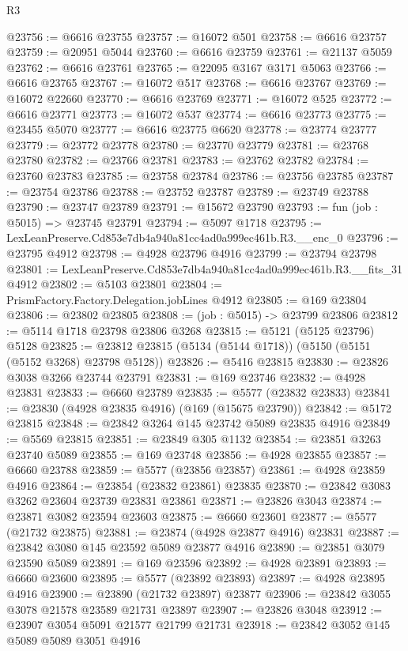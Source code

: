 \begin{lexlean}{R3}
\begin{coremodule}
@23756 := @6616 @23755
@23757 := @16072 @501
@23758 := @6616 @23757
@23759 := @20951 @5044
@23760 := @6616 @23759
@23761 := @21137 @5059
@23762 := @6616 @23761
@23765 := @22095 @3167 @3171 @5063
@23766 := @6616 @23765
@23767 := @16072 @517
@23768 := @6616 @23767
@23769 := @16072 @22660
@23770 := @6616 @23769
@23771 := @16072 @525
@23772 := @6616 @23771
@23773 := @16072 @537
@23774 := @6616 @23773
@23775 := @23455 @5070
@23777 := @6616 @23775 @6620
@23778 := @23774 @23777
@23779 := @23772 @23778
@23780 := @23770 @23779
@23781 := @23768 @23780
@23782 := @23766 @23781
@23783 := @23762 @23782
@23784 := @23760 @23783
@23785 := @23758 @23784
@23786 := @23756 @23785
@23787 := @23754 @23786
@23788 := @23752 @23787
@23789 := @23749 @23788
@23790 := @23747 @23789
@23791 := @15672 @23790
@23793 := fun (job : @5015) => @23745 @23791
@23794 := @5097 @1718
@23795 := LexLeanPreserve.Cd853e7db4a940a81cc4ad0a999ec461b.R3.__enc_0
@23796 := @23795 @4912
@23798 := @4928 @23796 @4916
@23799 := @23794 @23798
@23801 := LexLeanPreserve.Cd853e7db4a940a81cc4ad0a999ec461b.R3.__fits_31 @4912
@23802 := @5103 @23801
@23804 := PrismFactory.Factory.Delegation.jobLines @4912
@23805 := @169 @23804
@23806 := @23802 @23805
@23808 := (job : @5015) -> @23799 @23806
@23812 := @5114 @1718 @23798 @23806 @3268
@23815 := @5121 (@5125 @23796) @5128
@23825 := @23812 @23815 (@5134 (@5144 @1718)) (@5150 (@5151 (@5152 @3268) @23798 @5128))
@23826 := @5416 @23815
@23830 := @23826 @3038 @3266 @23744 @23791
@23831 := @169 @23746
@23832 := @4928 @23831
@23833 := @6660 @23789
@23835 := @5577 (@23832 @23833)
@23841 := @23830 (@4928 @23835 @4916) (@169 (@15675 @23790))
@23842 := @5172 @23815
@23848 := @23842 @3264 @145 @23742 @5089 @23835 @4916
@23849 := @5569 @23815
@23851 := @23849 @305 @1132
@23854 := @23851 @3263 @23740 @5089
@23855 := @169 @23748
@23856 := @4928 @23855
@23857 := @6660 @23788
@23859 := @5577 (@23856 @23857)
@23861 := @4928 @23859 @4916
@23864 := @23854 (@23832 @23861) @23835
@23870 := @23842 @3083 @3262 @23604 @23739 @23831 @23861
@23871 := @23826 @3043
@23874 := @23871 @3082 @23594 @23603
@23875 := @6660 @23601
@23877 := @5577 (@21732 @23875)
@23881 := @23874 (@4928 @23877 @4916) @23831
@23887 := @23842 @3080 @145 @23592 @5089 @23877 @4916
@23890 := @23851 @3079 @23590 @5089
@23891 := @169 @23596
@23892 := @4928 @23891
@23893 := @6660 @23600
@23895 := @5577 (@23892 @23893)
@23897 := @4928 @23895 @4916
@23900 := @23890 (@21732 @23897) @23877
@23906 := @23842 @3055 @3078 @21578 @23589 @21731 @23897
@23907 := @23826 @3048
@23912 := @23907 @3054 @5091 @21577 @21799 @21731
@23918 := @23842 @3052 @145 @5089 @5089 @3051 @4916

\end{coremodule}
\end{lexlean}
